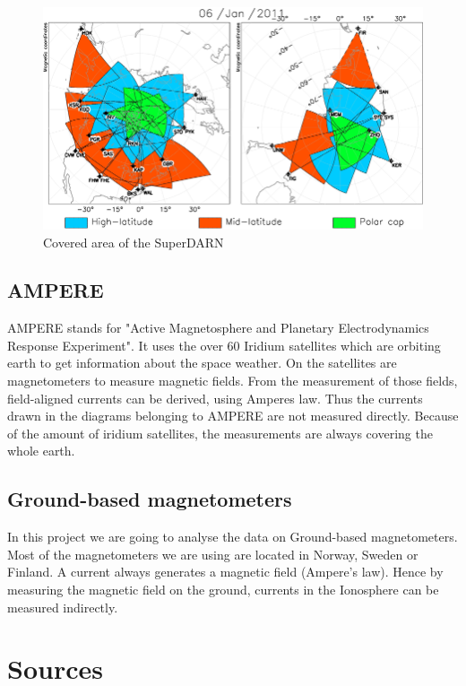 \documentclass[10pt,a4paper]{article}
\begin{document}
\begin{figure}[h]
	\includegraphics[scale = 1.5]{sd_1.png}
	\centering
	\caption{Covered area of the SuperDARN}
	\label{s1}
\end{figure}

\subsection{AMPERE}

AMPERE stands for "Active Magnetosphere and Planetary Electrodynamics Response Experiment". It uses the over 60  Iridium satellites which are orbiting earth to get information about the space weather. On the satellites are magnetometers to measure magnetic fields. From the measurement of those fields, field-aligned currents can be derived, using Amperes law. Thus the currents drawn in the diagrams belonging to AMPERE are not measured directly. Because of the amount of iridium satellites, the measurements are always covering the whole earth.

\subsection{Ground-based magnetometers}

In this project we are going to analyse the data on Ground-based magnetometers. Most of the magnetometers we are using are located in Norway, Sweden or Finland. A current always generates a magnetic field (Ampere's law). Hence by measuring the magnetic field on the ground, currents in the Ionosphere can be measured indirectly.




\section{Sources}
\end{document}
